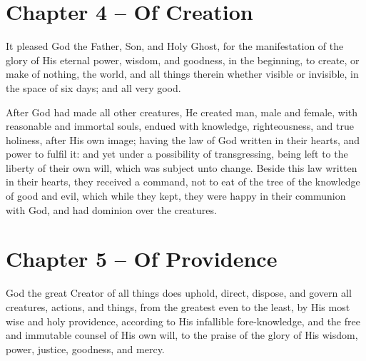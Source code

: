 \begin{outerlst}[left=0pt,labelsep=0pt]
\item
{}
\section{Chapter 4 -- Of Creation}
\begin{innerlst}[resume*]

\item It pleased God the Father, Son, and Holy Ghost, for the manifestation of the glory of His eternal power, wisdom, and goodness, in the beginning, to create, or make of nothing, the world, and all things therein whether visible or invisible, in the space of six days; and all very good.   

\item After God had made all other creatures, He created man, male and female, with reasonable and immortal souls, endued with knowledge, righteousness, and true holiness, after His own image; having the law of God written in their hearts, and power to fulfil it: and yet under a possibility of transgressing, being left to the liberty of their own will, which was subject unto change. Beside this law written in their hearts, they received a command, not to eat of the tree of the knowledge of good and evil, which while they kept, they were happy in their communion with God, and had dominion over the creatures.  
\end{innerlst}

\item
{}
\section{Chapter 5 -- Of Providence} 
\begin{innerlst}[resume*]

\item God the great Creator of all things does uphold, direct, dispose, and govern all creatures, actions, and things, from the greatest even to the least, by His most wise and holy providence, according to His infallible fore-knowledge, and the free and immutable counsel of His own will, to the praise of the glory of His wisdom, power, justice, goodness, and mercy.   


\end{innerlst}
\end{outerlst}
